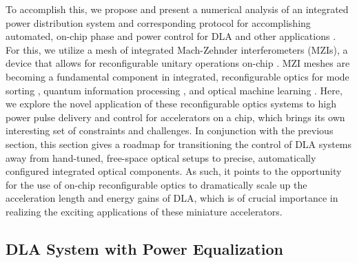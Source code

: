 To accomplish this, we propose and present a numerical analysis of an integrated power distribution system and corresponding protocol for accomplishing automated, on-chip phase and power control for DLA and other applications \cite{hughes_reconfigurable_2019}. For this, we utilize a mesh of integrated Mach-Zehnder interferometers (MZIs), a device that allows for reconfigurable unitary operations on-chip \cite{miller_self-configuring_2013,miller_perfect_2015}.  MZI meshes are becoming a fundamental component in integrated, reconfigurable optics for mode sorting \cite{miller_sorting_2015,annoni_unscrambling_2017,miller_setting_2017,miller_self-configuring_2018}, quantum information processing \cite{harris_quantum_2017,metcalf_multiphoton_2013,aspuru-guzik_photonic_2012,obrien_photonic_2009}, and optical machine learning \cite{shen_deep_2017, hughes2018training}.  Here, we explore the novel application of these reconfigurable optics systems to high power pulse delivery and control for accelerators on a chip, which brings its own interesting set of constraints and challenges.  In conjunction with the previous section, this section gives a roadmap for transitioning the control of DLA systems away from hand-tuned, free-space optical setups to precise, automatically configured integrated optical components.  As such, it points to the opportunity for the use of on-chip reconfigurable optics to dramatically scale up the acceleration length and energy gains of DLA, which is of crucial importance in realizing the exciting applications of these miniature accelerators.

\subsection{DLA System with Power Equalization}

